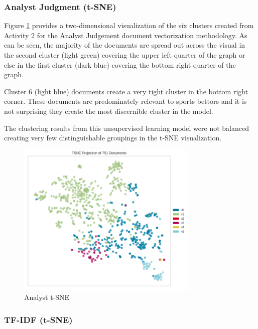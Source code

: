 \documentclass[5p,authoryear]{elsarticle}
\begin{document}
\subsubsection{Analyst Judgment (t-SNE)}\label{judge3}

Figure \ref{Analyst t-SNE} provides a two-dimensional visualization of the six clusters created from Activity 2 for the Analyst Judgement document vectorization methodology. 
As can be seen, the majority of the documents are spread out across the visual in the second cluster (light green) covering the upper left quarter of the graph or else in the first cluster (dark blue) covering the bottom right quarter of the graph. 

Cluster 6 (light blue) documents create a very tight cluster in the bottom right corner. 
These documents are predominately relevant to sports bettors and it is not surprising they create the most discernible cluster in the model.


The clustering results from this unsupervised learning model were not balanced creating very few distinguishable groupings in the t-SNE visualization. 



\begin{figure}[!htb] \centering
	\includegraphics[width=3.4in]{figures/analyst_tsne.png}
	\caption[]{Analyst t-SNE} 
	\label{Analyst t-SNE} 
\end{figure}



\subsubsection{TF-IDF (t-SNE)}\label{tfidf3}
\end{document}

